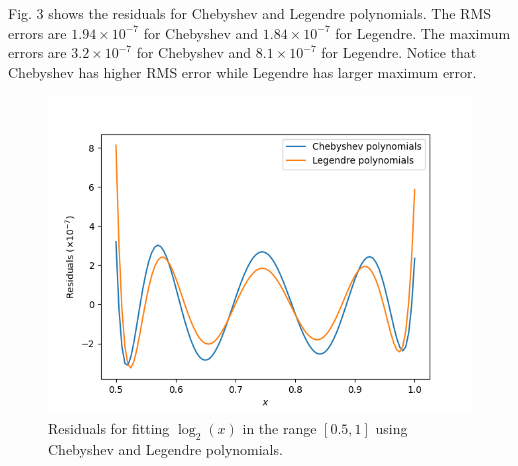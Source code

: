 \documentclass{article}
\begin{document}
Fig. 3 shows the residuals for Chebyshev and Legendre polynomials. The RMS errors are $1.94 \times 10^{-7}$ for Chebyshev and $1.84 \times 10^{-7}$ for Legendre. The maximum errors are $3.2 \times 10^{-7}$ for Chebyshev and $8.1 \times 10^{-7}$ for Legendre. Notice that Chebyshev has higher RMS error while Legendre has larger maximum error.
\begin{figure}[h]
    \centering
    \includegraphics[scale=0.55]{images/prob2_residuals.png}
    \caption{Residuals for fitting $\log_2(x)$ in the range $[0.5, 1]$ using Chebyshev and Legendre polynomials.}
\end{figure}

\newpage
\end{document}
